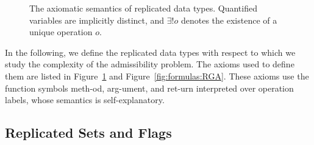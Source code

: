 



\begin{figure}[t]
  \footnotesize
  \hspace{-5mm}
  \begin{minipage}[t]{.48\linewidth}
    
  \end{minipage}
  \hfill
  \begin{minipage}[t]{.48\linewidth}
    
  \end{minipage}
  
  \vspace{-2em}
  \caption{The axiomatic semantics of replicated data types. Quantified variables are implicitly distinct, and $\exists! o$ denotes the existence of a unique operation $o$.}
  \label{fig:formulas:common}
  \vspace{-1em}
\end{figure}



In the following, we define the replicated data types with respect to which we study the complexity of the admissibility problem. The axioms used to define them are listed in Figure~\ref{fig:formulas:common} and Figure~\ref{fig:formulas:RGA}. These axioms use the function symbols {\sf meth}-od, {\sf arg}-ument, and {\sf ret}-urn interpreted over operation labels, whose semantics is self-explanatory. 

\subsection{Replicated Sets and Flags}

